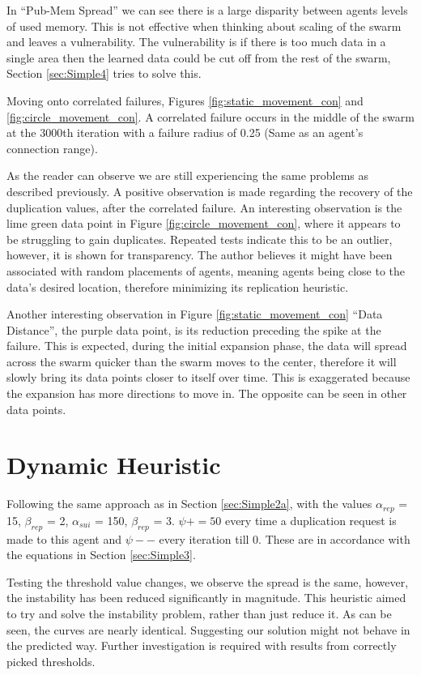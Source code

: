 \documentclass{UoYCSproject}
\begin{document}
In “Pub-Mem Spread” we can see there is a large disparity between agents levels of used memory.
This is not effective when thinking about scaling of the swarm and leaves a vulnerability.
The vulnerability is if there is too much data in a single area then the learned data could be cut off from the rest of the swarm, Section \ref{sec:Simple4} tries to solve this.

Moving onto correlated failures, Figures \ref{fig:static_movement_con} and \ref{fig:circle_movement_con}.
A correlated failure occurs in the middle of the swarm at the 3000th iteration with a failure radius of 0.25 (Same as an agent's connection range).

As the reader can observe we are still experiencing the same problems as described previously.
A positive observation is made regarding the recovery of the duplication values, after the correlated failure.
An interesting observation is the lime green data point in Figure \ref{fig:circle_movement_con}, where it appears to be struggling to gain duplicates.
Repeated tests indicate this to be an outlier, however, it is shown for transparency.
The author believes it might have been associated with random placements of agents, meaning agents being close to the data's desired location, therefore minimizing its replication heuristic.

Another interesting observation in Figure \ref{fig:static_movement_con} “Data Distance”, the purple data point, is its reduction preceding the spike at the failure.
This is expected, during the initial expansion phase, the data will spread across the swarm quicker than the swarm moves to the center, therefore it will slowly bring its data points closer to itself over time.
This is exaggerated because the expansion has more directions to move in.
The opposite can be seen in other data points.

\section{Dynamic Heuristic}
\label{sec:Simple3a}

Following the same approach as in Section \ref{sec:Simple2a}, with the values $\alpha_{rep}$ = 15, $\beta_{rep}$ = 2, $\alpha_{sui}$ = 150, $\beta_{rep}$ = 3.
$\psi+=50$ every time a duplication request is made to this agent and $\psi--$ every iteration till 0.
These are in accordance with the equations in Section \ref{sec:Simple3}.

Testing the threshold value changes, we observe the spread is the same, however, the instability has been reduced significantly in magnitude.
This heuristic aimed to try and solve the instability problem, rather than just reduce it.
As can be seen, the curves are nearly identical.
Suggesting our solution might not behave in the predicted way.
Further investigation is required with results from correctly picked thresholds.
\end{document}
